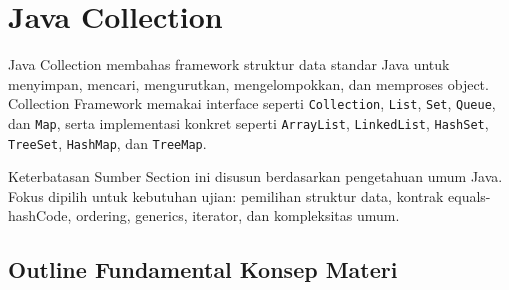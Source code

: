 \section{Java Collection}

Java Collection membahas framework struktur data standar Java untuk menyimpan, mencari, mengurutkan, mengelompokkan, dan memproses object. Collection Framework memakai interface seperti \texttt{Collection}, \texttt{List}, \texttt{Set}, \texttt{Queue}, dan \texttt{Map}, serta implementasi konkret seperti \texttt{ArrayList}, \texttt{LinkedList}, \texttt{HashSet}, \texttt{TreeSet}, \texttt{HashMap}, dan \texttt{TreeMap}.

\begin{cmt}{Keterbatasan Sumber}{}
Section ini disusun berdasarkan pengetahuan umum Java. Fokus dipilih untuk kebutuhan ujian: pemilihan struktur data, kontrak equals-hashCode, ordering, generics, iterator, dan kompleksitas umum.
\end{cmt}

\subsection{Outline Fundamental Konsep Materi}

